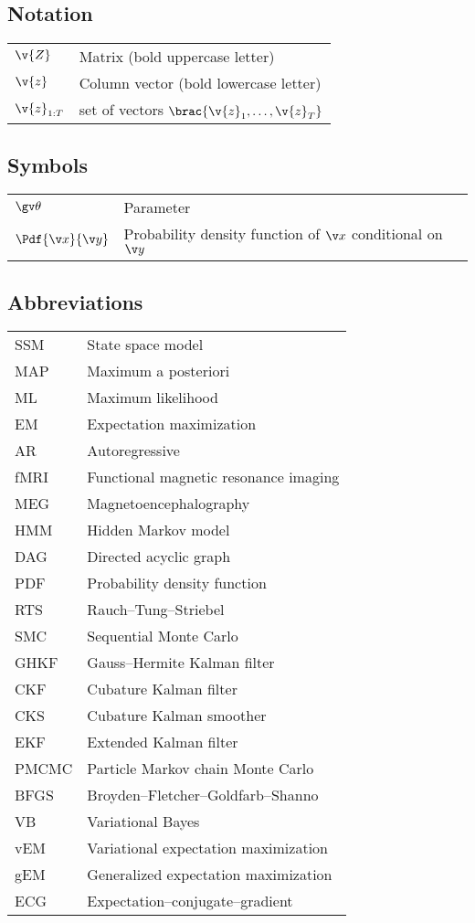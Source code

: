 \subsection*{Notation}
\begin{tabular}{ll}
$\v{Z}$  & Matrix (bold uppercase letter)  \\
$\v{z}$ & Column vector (bold lowercase letter) \\
$\v{z}_{1:T}$    & set of vectors $\brac{\v{z}_1,\dots,\v{z}_T}$
\end{tabular}


\subsection*{Symbols}

\begin{tabular}{ll}
$\Th$            & Parameter\\
$\Pdf{\x}{\y}$   & Probability density function of $\x$ conditional on $\y$
\end{tabular}

\subsection*{Abbreviations}

\begin{tabular}{ll}
SSM & State space model \\
MAP & Maximum a posteriori \\
ML & Maximum likelihood \\
EM & Expectation maximization \\
AR & Autoregressive \\
fMRI & Functional magnetic resonance imaging \\
MEG & Magnetoencephalography \\
HMM & Hidden Markov model \\
DAG & Directed acyclic graph \\
PDF & Probability density function \\
RTS & Rauch--Tung--Striebel \\
SMC & Sequential Monte Carlo \\
GHKF & Gauss--Hermite Kalman filter \\
CKF & Cubature Kalman filter \\
CKS & Cubature Kalman smoother \\
EKF & Extended Kalman filter \\
PMCMC & Particle Markov chain Monte Carlo \\
BFGS & Broyden--Fletcher--Goldfarb--Shanno\\
VB & Variational Bayes \\
vEM & Variational expectation maximization \\
gEM & Generalized expectation maximization \\
ECG & Expectation--conjugate--gradient
\end{tabular}